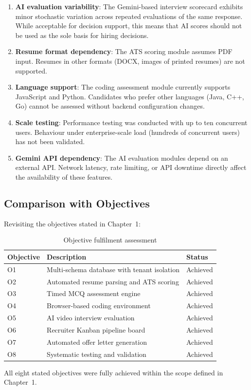 \begin{enumerate}[leftmargin=1.5em]
  \item \textbf{AI evaluation variability}: The Gemini-based interview scorecard exhibits minor stochastic variation across repeated evaluations of the same response. While acceptable for decision support, this means that AI scores should not be used as the sole basis for hiring decisions.

  \item \textbf{Resume format dependency}: The ATS scoring module assumes PDF input. Resumes in other formats (DOCX, images of printed resumes) are not supported.

  \item \textbf{Language support}: The coding assessment module currently supports JavaScript and Python. Candidates who prefer other languages (Java, C++, Go) cannot be assessed without backend configuration changes.

  \item \textbf{Scale testing}: Performance testing was conducted with up to ten concurrent users. Behaviour under enterprise-scale load (hundreds of concurrent users) has not been validated.

  \item \textbf{Gemini API dependency}: The AI evaluation modules depend on an external API. Network latency, rate limiting, or API downtime directly affect the availability of these features.
\end{enumerate}

\subsection{Comparison with Objectives}

Revisiting the objectives stated in Chapter~1:

\begin{table}[htbp]
\centering
\caption{Objective fulfilment assessment}
\label{tab:objectives}
\small
\begin{tabular}{p{0.6in}p{3.5in}p{1.2in}}
\toprule
\textbf{Objective} & \textbf{Description} & \textbf{Status} \\
\midrule
O1 & Multi-schema database with tenant isolation & Achieved \\
O2 & Automated resume parsing and ATS scoring & Achieved \\
O3 & Timed MCQ assessment engine & Achieved \\
O4 & Browser-based coding environment & Achieved \\
O5 & AI video interview evaluation & Achieved \\
O6 & Recruiter Kanban pipeline board & Achieved \\
O7 & Automated offer letter generation & Achieved \\
O8 & Systematic testing and validation & Achieved \\
\bottomrule
\end{tabular}
\end{table}

All eight stated objectives were fully achieved within the scope defined in Chapter~1.
